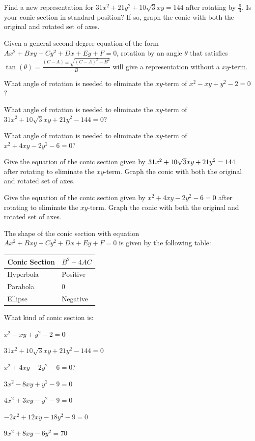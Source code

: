 \question Find a new representation for $31x^2+21y^2+10\sqrt{3}xy=144$ after rotating by $\frac{\pi}{3}$. Is your conic section in standard position? If so, graph the conic with both the original and rotated set of axes.

\begin{info} Given a general second degree equation of the form $Ax^2+Bxy+Cy^2+Dx+Ey+F=0$, rotation by an angle $\theta$ that satisfies
$\tan(\theta) = \frac{(C-A)\pm \sqrt{(C-A)^2+B^2}}{B}$ will give a representation without a $xy$-term.
\end{info}

\question What angle of rotation is needed to eliminate the $xy$-term of $x^2-xy+y^2-2=0$?

\question What angle of rotation is needed to eliminate the $xy$-term of $31x^2+10\sqrt{3}xy+21y^2-144=0$?

\question What angle of rotation is needed to eliminate the $xy$-term of $x^2+4xy-2y^2-6=0$?

\question Give the equation of the conic section given by $31x^2+ \break10\sqrt{3}xy +21y^2 =144$ after rotating to eliminate the $xy$-term. Graph the conic with both the original and rotated set of axes.

\question Give the equation of the conic section given by $x^2+4xy-2y^2-6=0$ after rotating to eliminate the $xy$-term. Graph the conic with both the original and rotated set of axes.

\begin{info}
The shape of the conic section with equation $Ax^2+Bxy+Cy^2+Dx+Ey+F=0$ is given by the following table:

\begin{tabular}{| l | l |}
\hline
Conic Section & $B^2-4AC$ \\
\hline
\hline
Hyperbola & Positive \\
Parabola & 0 \\
Ellipse & Negative \\
\hline
\end{tabular}\end{info}


\bq What kind of conic section is:
\be
\item $x^2-xy+y^2-2=0$
\item $31x^2+10\sqrt{3}  xy+21y^2-144=0$
\item $x^2+4xy-2y^2-6=0$?
\item $3x^2-8xy+y^2-9=0$
\item $4x^2+3xy-y^2-9=0$
\item $-2x^2+12xy-18y^2-9=0$
\item $9x^2+8xy-6y^2=70$
\ee
\eq

